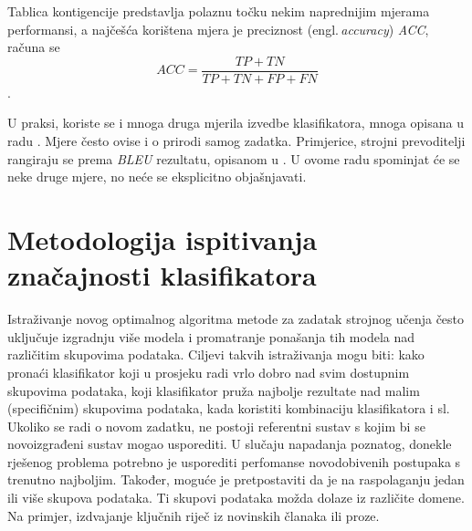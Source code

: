 Tablica kontigencije predstavlja polaznu točku nekim naprednijim mjerama performansi, a najčešća korištena mjera je preciznost (engl.\,\textit{accuracy}) \textit{ACC}, računa se
\begin{equation}
ACC = \frac{TP + TN}{TP + TN + FP + FN}
\end{equation}.

U praksi, koriste se i mnoga druga mjerila izvedbe klasifikatora, mnoga opisana u radu \cite{powers2011evaluation}. Mjere često ovise i o prirodi samog zadatka. Primjerice, strojni prevoditelji rangiraju se prema \textit{BLEU} rezultatu, opisanom u \citep{papineni2002bleu}. U ovome radu spominjat će se neke druge mjere, no neće se eksplicitno objašnjavati. 

\section{Metodologija ispitivanja značajnosti klasifikatora}

Istraživanje novog optimalnog algoritma metode za zadatak strojnog učenja često uključuje izgradnju više modela i promatranje ponašanja tih modela nad različitim skupovima podataka. Ciljevi takvih istraživanja mogu biti: kako pronaći klasifikator koji u prosjeku radi vrlo dobro nad svim dostupnim skupovima podataka, koji klasifikator pruža najbolje rezultate nad malim (specifičnim) skupovima podataka, kada koristiti kombinaciju klasifikatora i sl. Ukoliko se radi o novom zadatku, ne postoji referentni sustav s kojim bi se novoizgrađeni sustav mogao usporediti. U slučaju napadanja poznatog, donekle rješenog problema potrebno je usporediti perfomanse novodobivenih postupaka s trenutno najboljim. Također, moguće je pretpostaviti da je na raspolaganju jedan ili više skupova podataka. Ti skupovi podataka možda dolaze iz različite domene. Na primjer, izdvajanje ključnih riječ iz novinskih članaka ili proze. 

